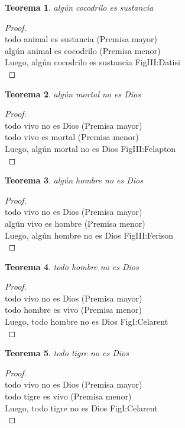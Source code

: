 ﻿\documentclass[12pt]{book}
\newtheorem{theorem}{Teorema}[chapter]
\newtheorem{proof}{Demostración}
\begin{document}
\begin{theorem}
algún cocodrilo es sustancia
\label{th: 87}
\end{theorem}\begin{proof}\\todo animal es sustancia	 (Premisa mayor) \\algún animal es cocodrilo	 (Premisa menor) \\Luego, algún cocodrilo es sustancia	FigIII:Datisi \\ \end{proof}
\begin{theorem}
algún mortal no es Dios
\label{th: 88}
\end{theorem}\begin{proof}\\todo vivo no es Dios	 (Premisa mayor) \\todo vivo es mortal	 (Premisa menor) \\Luego, algún mortal no es Dios	FigIII:Felapton \\ \end{proof}
\begin{theorem}
algún hombre no es Dios
\label{th: 89}
\end{theorem}\begin{proof}\\todo vivo no es Dios	 (Premisa mayor) \\algún vivo es hombre	 (Premisa menor) \\Luego, algún hombre no es Dios	FigIII:Ferison \\ \end{proof}
\begin{theorem}
todo hombre no es Dios
\label{th: 90}
\end{theorem}\begin{proof}\\todo vivo no es Dios	 (Premisa mayor) \\todo hombre es vivo	 (Premisa menor) \\Luego, todo hombre no es Dios	FigI:Celarent \\ \end{proof}
\begin{theorem}
todo tigre no es Dios
\label{th: 91}
\end{theorem}\begin{proof}\\todo vivo no es Dios	 (Premisa mayor) \\todo tigre es vivo	 (Premisa menor) \\Luego, todo tigre no es Dios	FigI:Celarent \\ \end{proof}
\end{document}
